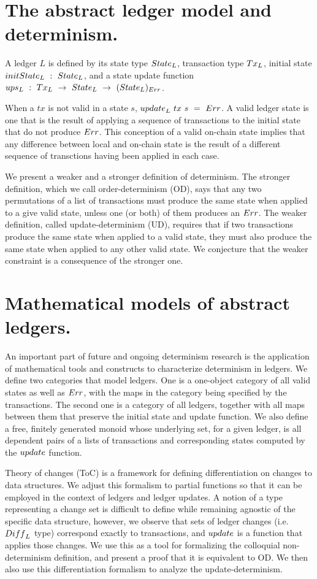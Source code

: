 \section{The abstract ledger model and determinism. }
\label{sec:the-model}
A ledger $L$ is defined by its state type $\State_L$, transaction
type $\Tx_L$, initial state $\fun{initState}_L~:~\type{State}_L$,
and a state update function $ups_L~:~\type{Tx}_L~\to~\type{State}_L~\to~(\type{State}_L)_{\Err}$.

When a $tx$ is not valid in a state $s$, $\ups_L~tx~s~=~\Err$.
A valid ledger state is one that is the result
of applying a sequence of transactions to the initial state that do not
produce $\Err$. This conception of a valid on-chain state implies that any difference between
local and on-chain state is the result of a different sequence of transctions
having been applied in each case.

We present a weaker and a stronger definition of determinism. The stronger definition,
which we call order-determinism (OD), says that
any two permutations of a list of transactions must produce the same state when
applied to a give valid state, unless one (or both) of them produces an $\Err$.
The weaker definition, called update-determinism (UD), requires that if two transactions produce the same state
when applied to a valid state, they must also produce the same state when applied
to any other valid state. We conjecture that the weaker constraint is a consequence of
the stronger one.

\section{Mathematical models of abstract ledgers. }
\label{sec:math}

An important part of future and ongoing determinism research is the application of
mathematical tools and constructs to characterize determinism in ledgers.
We define two categories that model ledgers. One is a one-object category of all valid states
as well as $\Err$, with the maps in the category being specified by the transactions.
The second one is a category of all ledgers, together with all maps between them that preserve the initial
state and update function. We also define a free, finitely generated monoid whose
underlying set, for a given ledger, is all dependent pairs of a lists of transactions
and corresponding states computed by the $\ups$ function.

Theory of changes (ToC) \cite{incremental} is a framework for defining differentiation
on changes to data structures. We adjust this formalism to partial functions so that
it can be employed in the context of ledgers and ledger updates.
A notion of a type representing a change
set is difficult to define while remaining agnostic of the specific data structure, however,
we observe that sets of ledger changes (i.e. $\Diff_L$ type) correspond exactly to transactions,
and $\ups$ is a function that applies those changes.
We use this as a tool for formalizing the colloquial non-determinism definition,
and present a proof that it is equivalent to OD. We then also
use this differentiation formalism to analyze the update-determinism.

